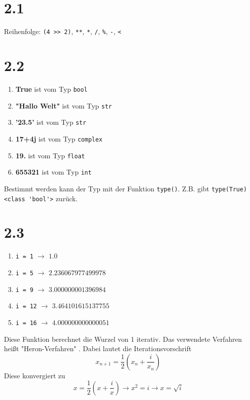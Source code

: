 \section*{2.1}
Reihenfolge: \verb+(4 >> 2)+, \verb+**+, \verb+*+, \verb+/+, \verb+%+, \verb+-+, \verb+<+

\section*{2.2}
\begin{enumerate}
    \item \textbf{True} ist vom Typ \verb+bool+
    \item \textbf{"Hallo Welt"} ist vom Typ \verb+str+
    \item \textbf{'23.5'} ist vom Typ \verb+str+
    \item \textbf{17+4j} ist vom Typ \verb+complex+
    \item \textbf{19.} ist vom Typ \verb+float+
    \item \textbf{655321} ist vom Typ \verb+int+
\end{enumerate}
Bestimmt werden kann der Typ mit der Funktion \verb+type()+. Z.B. gibt \verb+type(True)+ \verb+<class 'bool'>+ zurück.

\section*{2.3}
\begin{enumerate}
    \item \verb+i = 1+ $\rightarrow$ $1.0$
    \item \verb+i = 5+ $\rightarrow$ $2.236067977499978$
    \item \verb+i = 9+ $\rightarrow$ $3.000000001396984$
    \item \verb+i = 12+ $\rightarrow$ $3.464101615137755$
    \item \verb+i = 16+ $\rightarrow$ $4.000000000000051$
\end{enumerate}
Diese Funktion berechnet die Wurzel von 1 iterativ.
Das verwendete Verfahren heißt "Heron-Verfahren" \cite{heron}.
Dabei lautet die Iterationsvorschrift
$$x_{n+1} = \frac{1}{2}(x_n + \frac{i}{x_n})$$
Diese konvergiert zu
$$x = \frac{1}{2}(x + \frac{i}{x}) \rightarrow x^2 = i \rightarrow x = \sqrt{i}$$